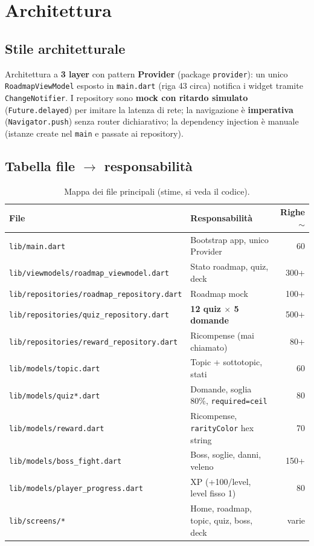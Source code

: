 \chapter{Architettura}
\label{ch:architettura}

\section{Stile architetturale}
Architettura a \textbf{3 layer} con pattern \textbf{Provider} (package
\texttt{provider}): un unico \texttt{RoadmapViewModel} esposto in
\texttt{main.dart} (riga 43 circa) notifica i widget tramite
\texttt{ChangeNotifier}. I repository sono \textbf{mock con ritardo
simulato} (\texttt{Future.delayed}) per imitare la latenza di rete; la
navigazione è \textbf{imperativa} (\texttt{Navigator.push}) senza router
dichiarativo; la dependency injection è manuale (istanze create nel
\texttt{main} e passate ai repository).

\section{Tabella file $\rightarrow$ responsabilità}
\begin{table}[h]
\centering\small
\begin{tabular}{@{}lp{6cm}r@{}}
\toprule
File & Responsabilità & Righe $\sim$ \\
\midrule
\texttt{lib/main.dart} & Bootstrap app, unico Provider & 60 \\
\texttt{lib/viewmodels/roadmap\_viewmodel.dart} & Stato roadmap, quiz, deck & 300+ \\
\texttt{lib/repositories/roadmap\_repository.dart} & Roadmap mock & 100+ \\
\texttt{lib/repositories/quiz\_repository.dart} & \textbf{12 quiz $\times$ 5 domande} & 500+ \\
\texttt{lib/repositories/reward\_repository.dart} & Ricompense (mai chiamato) & 80+ \\
\texttt{lib/models/topic.dart} & Topic + sottotopic, stati & 60 \\
\texttt{lib/models/quiz*.dart} & Domande, soglia 80\%, \texttt{required=ceil} & 80 \\
\texttt{lib/models/reward.dart} & Ricompense, \texttt{rarityColor} hex string & 70 \\
\texttt{lib/models/boss\_fight.dart} & Boss, soglie, danni, veleno & 150+ \\
\texttt{lib/models/player\_progress.dart} & XP (+100/level, level fisso 1) & 80 \\
\texttt{lib/screens/*} & Home, roadmap, topic, quiz, boss, deck & varie \\
\bottomrule
\end{tabular}
\caption{Mappa dei file principali (stime, si veda il codice).}
\label{tab:file}
\end{table}

